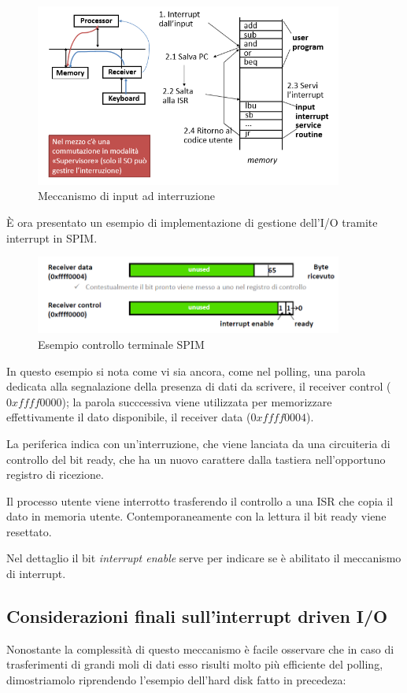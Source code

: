 \documentclass[class=book, crop=false, oneside]{standalone}
\begin{document}
\begin{figure}[!h]
	\centering
	\includegraphics[width=0.9\textwidth,keepaspectratio]{input-a-interruzione}
	\caption{Meccanismo di input ad interruzione}
\end{figure}
È ora presentato un esempio di implementazione di gestione dell'I/O tramite interrupt in SPIM.
\begin{figure}[!h]
	\centering
	\includegraphics[width=0.9\textwidth,keepaspectratio]{SPIM2}
	\caption{Esempio controllo terminale SPIM}
\end{figure}
In questo esempio si nota come vi sia ancora, come nel polling, una parola dedicata alla segnalazione della presenza di dati da scrivere, il receiver control (\(0xffff0000\)); la parola succcessiva viene utilizzata per memorizzare effettivamente il dato disponibile, il receiver data (\(0xffff0004\)).

La periferica indica con un'interruzione, che viene lanciata da una circuiteria di controllo del bit ready, che ha un nuovo carattere dalla tastiera nell'opportuno registro di ricezione.

Il processo utente viene interrotto trasferendo il controllo a una ISR che copia il dato in memoria utente. Contemporaneamente con la lettura il bit ready viene resettato.

Nel dettaglio il bit \emph{interrupt enable} serve per indicare se è abilitato il meccanismo di interrupt.

\subsection{Considerazioni finali sull'interrupt driven I/O}
Nonostante la complessità di questo meccanismo è facile osservare che in caso di trasferimenti di grandi moli di dati esso risulti  molto più efficiente del polling, dimostriamolo riprendendo l'esempio dell'hard disk fatto in precedeza:
\end{document}
